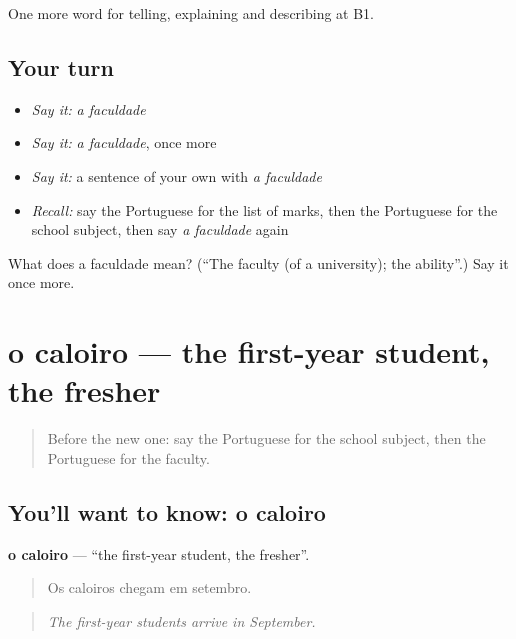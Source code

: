 \begin{grammarlens}[title={What you've built}]
One more word for telling, explaining and describing at B1.
\end{grammarlens}

\subsection*{Your turn}
\begin{itemize}
\raggedright
  \item \emph{Say it:} \emph{a faculdade}
  \item \emph{Say it:} \emph{a faculdade}, once more
  \item \emph{Say it:} a sentence of your own with \emph{a faculdade}
  \item \emph{Recall:} say the Portuguese for the list of marks, then the Portuguese for the school subject, then say \emph{a faculdade} again
\end{itemize}

\begin{tcolorbox}[breakable,colback=teal!4,colframe=teal!35!black,title={Before you move on}]
What does a faculdade mean? (\textquotedblleft{}The faculty (of a university); the ability\textquotedblright{}.) Say it once more.
\end{tcolorbox}
\section[o caloiro]{o caloiro — the first-year student, the fresher}

\label{lesson:PT-C376-caloiro}



\begin{quote}
Before the new one: say the Portuguese for the school subject, then the Portuguese for the faculty.
\end{quote}

\subsection*{You'll want to know: o caloiro}
\textbf{o caloiro} — \textquotedblleft{}the first-year student, the fresher\textquotedblright{}.

\begin{quote}
Os caloiros chegam em setembro.
\end{quote}

\begin{quote}
\emph{The first-year students arrive in September.}
\end{quote}

